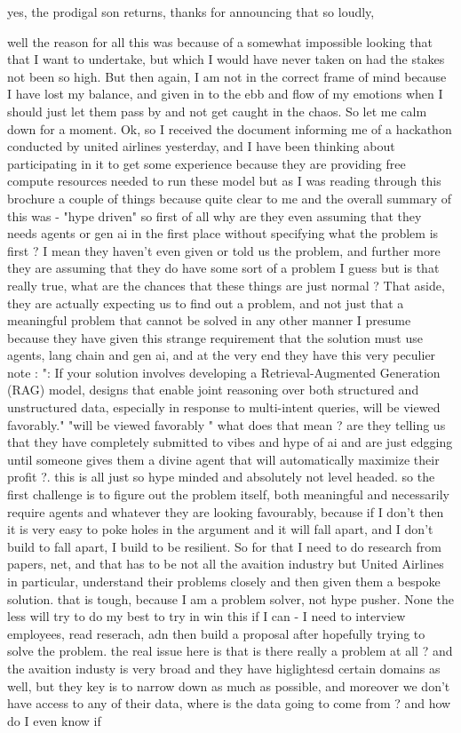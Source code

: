 \begin{userprompt}
yes, the prodigal son returns, thanks for announcing that so loudly,

well the reason for all this was because of a somewhat impossible looking that that I want to undertake, but which I would have never taken on had the stakes not been so high. But then again, I am not in the correct frame of mind because I have lost my balance, and given in to the ebb and flow of my emotions when I should just let them pass by and not get caught in the chaos. So let me calm down for a moment. Ok, so I received the document informing me of a hackathon conducted by united airlines yesterday, and I have been thinking about participating in it to get some experience because they are providing free compute resources needed to run these model but as I was reading through this brochure a couple of things because quite clear to me and the overall summary of this was - "hype driven" so first of all why are they even assuming that they needs agents or gen ai in the first place without specifying what the problem is first ? I mean they haven't even given or told us the problem, and further more they are assuming that they do have some sort of a problem I guess but is that really true, what are the chances that these things are just normal ? That aside, they are actually expecting us to find out a problem, and not just that a meaningful problem that cannot be solved in any other manner I presume because they have given this strange requirement that the solution must use agents, lang chain and gen ai, and at the very end they have this very peculier note : ": If your solution involves developing a Retrieval-Augmented Generation (RAG) model, designs that enable joint reasoning over both structured and unstructured data, especially in response to multi-intent queries, will be viewed favorably." "will be viewed favorably " what does that mean ? are they telling us that they have completely submitted to vibes and hype of ai and are just edgging until someone gives them a divine agent that will automatically maximize their profit ?. this is all just so hype minded and absolutely not level headed. so the first challenge is to figure out the problem itself, both meaningful and necessarily require agents and whatever they are looking favourably, because if I don't then it is very easy to poke holes in the argument and it will fall apart, and I don't build to fall apart, I build to be resilient. So for that I need to do research from papers, net, and that has to be not all the avaition industry but United Airlines in particular, understand their problems closely and then given them a bespoke solution. that is tough, because I am a problem solver, not hype pusher. None the less will try to do my best to try in win this if I can - I need to interview employees, read reserach, adn then build a proposal after hopefully trying to solve the problem. the real issue here is that is there really a problem at all ? and the avaition industy is very broad and they have higlightesd certain domains as well, but they key is to narrow down as much as possible, and moreover we don't have access to any of their data, where is the data going to come from ? and how do I even know if 
\end{userprompt}
